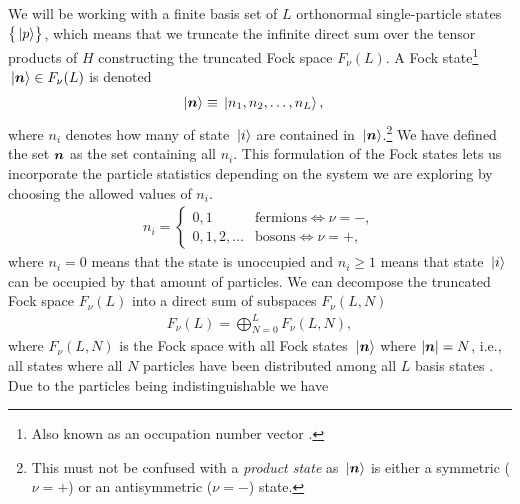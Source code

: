             We will be working with a finite basis set of $L$ orthonormal
            single-particle states $\left\{ \ket*{p} \right\}$, which means that we
            truncate the infinite direct sum over the tensor products of $H$
            constructing the truncated Fock space $F_{\nu}(L)$.
            A Fock state\footnote{%
                Also known as an occupation number vector
                \cite{helgaker-molecular}.
            } $\ket*{\boldsymbol{n}} \in F_{\nu}(L)$ is denoted
            \begin{align}
                \ket*{\boldsymbol{n}}
                &\equiv \ket*{n_1, n_2, \dots, n_L},
            \end{align}
            where $n_i$ denotes how many of state $\ket*{i}$ are contained in
            $\ket*{\boldsymbol{n}}$.\footnote{%
                This must not be confused with a \emph{product state} as
                $\ket*{\boldsymbol{n}}$ is either a symmetric ($\nu = +$) or an
                antisymmetric ($\nu = -$) state.%
            }
            We have defined the set $\boldsymbol{n}$ as the set containing all $n_i$.
            This formulation of the Fock states lets us incorporate the particle
            statistics depending on the system we are exploring by choosing the
            allowed values of $n_i$.
            \begin{align}
                n_i =
                \begin{cases}
                    0, 1 & \text{fermions} \iff \nu = -, \\
                    0, 1, 2, \dots & \text{bosons} \iff \nu = +,
                \end{cases}
            \end{align}
            where $n_i = 0$ means that the state is unoccupied and $n_i \geq 1$
            means that state $\ket*{i}$ can be occupied by that amount of
            particles.
            We can decompose the truncated Fock space $F_{\nu}(L)$ into a direct
            sum of subspaces $F_{\nu}(L, N)$
            \begin{align}
                F_{\nu}(L)
                = \bigoplus_{N = 0}^{L}
                F_{\nu}(L, N),
            \end{align}
            where $F_{\nu}(L, N)$ is the Fock space with all Fock states
            $\ket*{\boldsymbol{n}}$ where $\abs{\boldsymbol{n}} = N$, i.e., all states where
            all $N$ particles have been distributed among all $L$ basis states
            \cite{helgaker-molecular}.
            Due to the particles being indistinguishable we have
